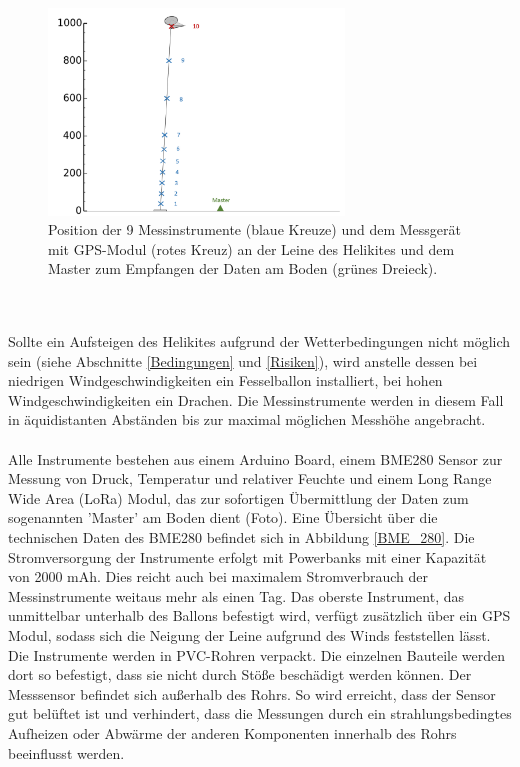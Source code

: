 \documentclass[a4paper,11pt,DIV=calc,tablecaptionabove,headinclude,twoside]{article}
\begin{document}
\begin{figure}[t]
\centering
\includegraphics[width=0.7\textwidth]{Helikite.png}
\captionsetup{width=11cm}
\caption{Position der 9 Messinstrumente (blaue Kreuze) und dem Messgerät mit GPS-Modul (rotes Kreuz) an der Leine des Helikites und dem Master zum Empfangen der Daten am Boden (grünes Dreieck). }
\label{helikite}
\end{figure}
\\\\
Sollte ein Aufsteigen des Helikites aufgrund der Wetterbedingungen nicht möglich sein (siehe Abschnitte \ref{Bedingungen} und \ref{Risiken}), wird anstelle dessen bei niedrigen Windgeschwindigkeiten ein Fesselballon installiert, bei hohen Windgeschwindigkeiten ein Drachen. Die Messinstrumente werden in diesem Fall in äquidistanten Abständen bis zur maximal möglichen Messhöhe angebracht. \\\\
Alle Instrumente bestehen aus einem Arduino Board, einem BME280 Sensor zur Messung von Druck, Temperatur und relativer Feuchte und einem Long Range Wide Area (LoRa) Modul, das zur sofortigen Übermittlung der Daten zum sogenannten 'Master' am Boden dient (Foto). Eine Übersicht über die technischen Daten des BME280 befindet sich in Abbildung \ref{BME_280}. Die Stromversorgung der Instrumente erfolgt mit Powerbanks mit einer Kapazität von 2000 mAh. Dies reicht auch bei maximalem Stromverbrauch der Messinstrumente weitaus mehr als einen Tag. Das oberste Instrument, das unmittelbar unterhalb des Ballons befestigt wird, verfügt zusätzlich über ein GPS Modul, sodass sich die Neigung der Leine aufgrund des Winds feststellen lässt. Die Instrumente werden in PVC-Rohren verpackt. Die einzelnen Bauteile werden dort so befestigt, dass sie nicht durch Stöße beschädigt werden können. Der Messsensor befindet sich außerhalb des Rohrs. So wird erreicht, dass der Sensor gut belüftet ist und verhindert, dass die Messungen durch ein strahlungsbedingtes Aufheizen oder Abwärme der anderen Komponenten innerhalb des Rohrs beeinflusst werden.  
\end{document}
